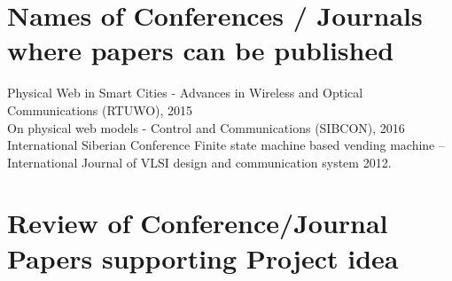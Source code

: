 \documentclass[oneside,a4paper,12pt]{report}
\begin{document}
\section{Names of Conferences / Journals where papers can be published}

 Physical Web in Smart Cities - Advances in Wireless and Optical Communications (RTUWO), 2015\\
 On physical web models - Control and Communications (SIBCON), 2016 \\
International Siberian Conference Finite state machine based vending machine – International Journal of VLSI design and communication system 2012.\\


\section{Review of Conference/Journal Papers supporting Project idea}
\label{sec:survey}
\end{document}
